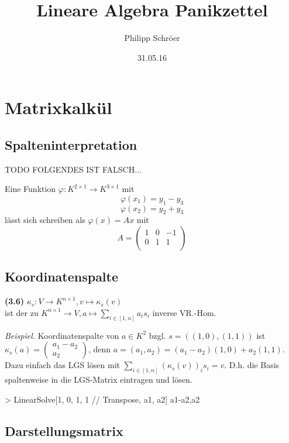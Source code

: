 \documentclass[11pt]{scrartcl}
\title{\textbf{Lineare Algebra Panikzettel}}
\author{Philipp Schröer}
\date{31.05.16}
\newlength{\hangwidth}
\newcommand{\skript}[1]{\settowidth{\hangwidth}{\textbf{(#1)} }\hangpara{\hangwidth}{1}\textbf{(#1)} }
\begin{document}
\maketitle

\section{Matrixkalkül}

\subsection{Spalteninterpretation}

TODO FOLGENDES IST FALSCH...

Eine Funktion $\varphi : K^{2 \times 1} \to K^{3 \times 1}$ mit
$$\varphi(x_1) = y_1 - y_3$$
$$\varphi(x_2) = y_2 + y_3$$
lässt sich schreiben als $\varphi(x) = Ax$ mit
$$A = \begin{pmatrix}
	1 & 0 & -1 \\
    0 & 1 & 1 \\
\end{pmatrix}
$$

\subsection{Koordinatenspalte}

\skript{3.6}$\kappa_s : V \to K^{n \times 1}, v \mapsto \kappa_s(v)$ \\
ist der zu $K^{n \times 1} \to V, a \mapsto \sum_{i \in [1,n]} a_i s_i$ inverse VR.-Hom.

\textit{Beispiel.} Koordinatenspalte von $a \in K^2$ bzgl. $s = ((1,0), (1,1))$ ist $\kappa_s(a) = \begin{pmatrix} a_1 - a_2 \\ a_2 \end{pmatrix}$, denn $a = (a_1, a_2) = (a_1 - a_2) (1,0) + a_2 (1,1)$. Dazu einfach das LGS lösen mit $\sum_{i \in [1,n]} (\kappa_s(v))_i s_i = v$. D.h. die Basis spaltenweise in die LGS-Matrix eintragen und lösen.

\begin{mat}
> LinearSolve[{{1, 0}, {1, 1}} // Transpose, {a1, a2}]
{a1-a2,a2}
\end{mat}

\subsection{Darstellungsmatrix}
\end{document}
